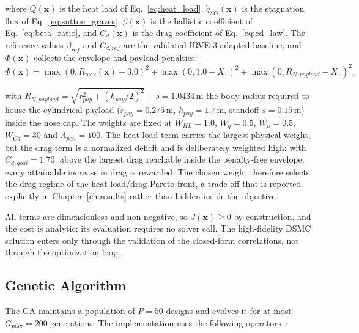 \noindent where $Q(\mathbf{x})$ is the heat load of Eq.~\eqref{eq:heat_load}, $\dot{q}_{SG}(\mathbf{x})$ is the stagnation flux of Eq.~\eqref{eq:sutton_graves}, $\beta(\mathbf{x})$ is the ballistic coefficient of Eq.~\eqref{eq:beta_ratio}, and $C_d(\mathbf{x})$ is the drag coefficient of Eq.~\eqref{eq:cd_law}. The reference values $\beta_{ref}$ and $C_{d,ref}$ are the validated IRVE-3-adapted baseline, and $\Phi(\mathbf{x})$ collects the envelope and payload penalties:
\begin{equation}
    \Phi(\mathbf{x}) = \max(0, R_{\max}(\mathbf{x}) - 3.0)^{2} + \max(0, 1.0 - X_1)^{2} + \max(0, R_{N,payload} - X_1)^{2},
    \label{eq:penalty}
\end{equation}

\noindent with $R_{N,payload}=\sqrt{r_{pay}^2+(h_{pay}/2)^2}+s = 1.0434$\,m the body radius required to house the cylindrical payload ($r_{pay}=0.275$\,m, $h_{pay}=1.7$\,m, standoff $s=0.15$\,m) inside the nose cap. The weights are fixed at $W_{HL} = 1.0$, $W_{q} = 0.5$, $W_{\beta} = 0.5$, $W_{Cd} = 30$ and $\Lambda_{pen} = 100$. The heat-load term carries the largest physical weight, but the drag term is a normalized deficit and is deliberately weighted high: with $C_{d,goal} = 1.70$, above the largest drag reachable inside the penalty-free envelope, every attainable increase in drag is rewarded. The chosen weight therefore selects the drag regime of the heat-load/drag Pareto front, a trade-off that is reported explicitly in Chapter~\ref{ch:results} rather than hidden inside the objective.

All terms are dimensionless and non-negative, so $J(\mathbf{x}) \ge 0$ by construction, and the cost is analytic: its evaluation requires no solver call. The high-fidelity DSMC solution enters only through the validation of the closed-form correlations, not through the optimization loop.

\subsection{Genetic Algorithm}
\label{sec:ga_operators}

The GA maintains a population of $P = 50$ designs and evolves it for at most $G_{\max} = 200$ generations. The implementation uses the following operators~\cite{Goldberg1989}:

